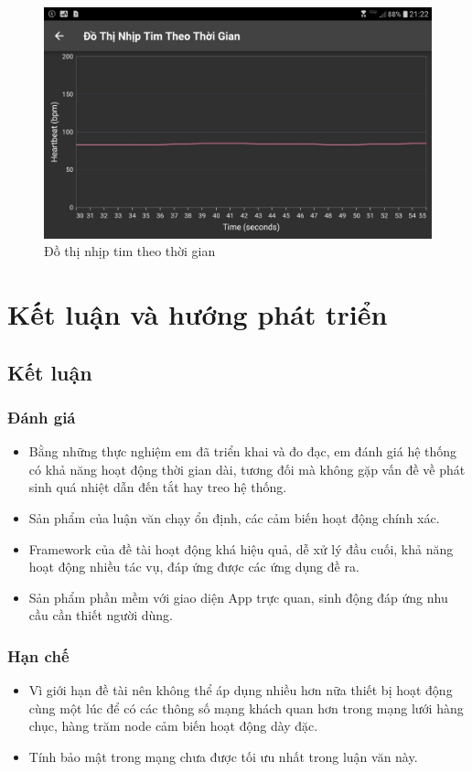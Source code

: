 \documentclass{report}
\begin{document}
\begin{figure}[h]
	\centering
	\includegraphics[scale = 0.17]{fig63.png}
	\caption{Đồ thị nhịp tim theo thời gian}
	\label{fig:Graph63}
\end{figure}
\chapter{Kết luận và hướng phát triển}
\section{Kết luận}
\subsection{Đánh giá}
\begin{itemize}
	\item Bằng những thực nghiệm em đã triển khai và đo đạc, em đánh giá hệ thống có khả năng
	hoạt động thời gian dài, tương đối mà không gặp vấn đề về phát sinh quá nhiệt dẫn đến
	tắt hay treo hệ thống.
	\item  Sản phẩm của luận văn chạy ổn định, các cảm biến hoạt động chính xác. 
	\item Framework của đề tài hoạt động khá hiệu quả, dễ xử lý đầu cuối, khả năng hoạt động
	nhiều tác vụ, đáp ứng được các ứng dụng đề ra.
	\item Sản phẩm phần mềm với giao diện App trực quan, sinh động đáp ứng nhu cầu
	cần thiết người dùng.
\end{itemize}
\subsection{Hạn chế}
\begin{itemize}
	\item Vì giới hạn đề tài nên không thể áp dụng nhiều hơn nữa thiết bị hoạt động cùng một lúc
	để có các thông số mạng khách quan hơn trong mạng lưới hàng chục, hàng trăm node
	cảm biến hoạt động dày đặc.
	\item Tính bảo mật trong mạng chưa được tối ưu nhất trong luận văn này.
\end{itemize}
\end{document}
